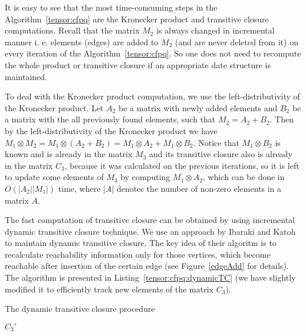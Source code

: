It is easy to see that the most time-consuming steps in the Algorithm~\ref{tensor:cfpq} are the Kronecker product and transitive closure computations. Recall that the matrix $M_2$ is always changed in incremental manner i. e. elements (edges) are added to $M_2$ (and are never deleted from it) on every iteration of the Algorithm~\ref{tensor:cfpq}. So one does not need to recompute the whole product or transitive closure if an appropriate date structure is maintained.


To deal with the Kronecker product computation, we use the left-distributivity of the Kronecker product. Let $A_2$ be a matrix with newly added elements and $B_2$ be a matrix with the all previously found elements, such that $M_2 = A_2 + B_2$. Then by the left-distributivity of the Kronecker product we have $M_1 \otimes M_2 = M_1 \otimes (A_2 + B_2) = M_1\otimes A_2 + M_1 \otimes B_2$. Notice that $M_1 \otimes B_2$ is known and is already in the matrix $M_3$ and its transitive closure also is already in the matrix $C_3$, because it was calculated on the previous iterations, so it is left to update some elements of $M_3$ by computing $M_1\otimes A_2$,  which can be done in $O(|A_2||M_1|)$ time, where $|A|$ denotes the number of non-zero elements in a matrix $A$.


The fast computation of transitive closure can be obtained by using incremental dynamic transitive closure technique. We use an approach by Ibaraki and Katoh~\cite{IBARAKI198395} to maintain dynamic transitive closure. The key idea of their algoritm is to recalculate reachability information only for those vertices, which become reachable after insertion of the certain edge (see Figure~\ref{edgeAdd} for details). The algorithm is presented in Listing~\ref{tensor:cfpq:dynamicTC} (we have slightly modified it to efficiently track new elements of the matrix $C_3$). 

\begin{algorithm}[h]
\begin{algorithmic}[1]
\footnotesize
\caption{The dynamic transitive closure procedure}
\label{tensor:cfpq:dynamicTC}
                \EndIf        
              \EndFor
        \EndFor
\State \Return $C_3'$
\EndFunction
\end{algorithmic}
\end{algorithm}

